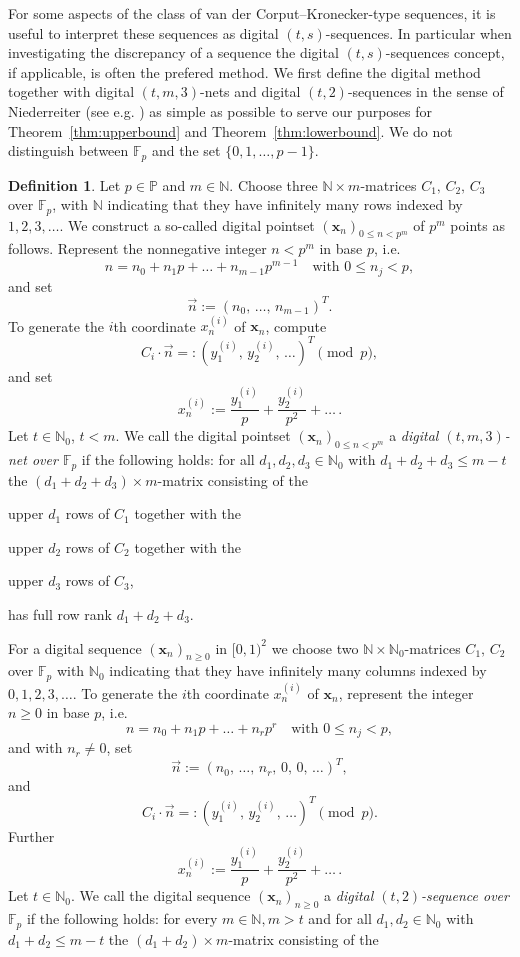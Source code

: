 \documentclass{article}
\newcommand{\bsx}{\boldsymbol{x}}%
\newcommand{\bsT}{\boldsymbol{T}}%
\newcommand{\NN}{\mathbb N}
\newcommand{\PP}{\mathbb P}
\newcommand{\FF}{\mathbb{F}}
\renewcommand{\(}{\left (}
\renewcommand{\)}{\right )}
\theoremstyle{definition}
\newtheorem{definition}[theorem]{Definition}
\numberwithin{equation}{section}
\begin{document}
For some aspects of the class of van der Corput--Kronecker-type sequences, it is useful to interpret these sequences as digital $(t,s)$-sequences. In particular when investigating the discrepancy of a sequence the digital $(t,s)$-sequences concept, if applicable, is often the prefered method. We first define the digital method together with digital $(t,m,3)$-nets and digital $(t,2)$-sequences in the sense of Niederreiter (see e.g. \cite{niesiam}) as simple as possible to serve our purposes for Theorem~\ref{thm:upperbound} and Theorem~\ref{thm:lowerbound}. We do not distinguish between $\FF_p$ and the set $\{0,1,\ldots,p-1\}$. 



\begin{definition}\label{def:t}
Let $p\in\PP$ and $m\in\NN$. Choose three $\NN\times m$-matrices $C_1,\,C_2,\,C_3$ over $\FF_p$, with $\NN$ indicating that they have infinitely many rows indexed by $1,2,3,\ldots$.  We construct a so-called digital pointset $(\bsx_n)_{0\leq n<p^m}$ of $p^m$ points as follows. Represent the nonnegative integer $n<p^m$ in base $p$, i.e.
$$ n = n_0+n_1p+\dots+n_{m-1}p^{m-1}\quad \mbox{with }0\leq n_j<p, $$
and set
$$ \vec n :=(n_0,\,\dots,\,n_{m-1})^T. $$
To generate the $i$th coordinate $x_n^{(i)}$ of $\bsx_n$, compute 
$$ C_i\cdot\vec n =:(y_1^{(i)},\,y_2^{(i)},\,\dots)^T\pmod{p}, $$
and set
$$ x_n^{(i)}:=\frac {y_1^{(i)}}p+\frac {y_2^{(i)}}{p^2}+\dots\,. $$
Let $t\in\NN_0$, $t<m$. We call the digital pointset $(\bsx_n)_{0\leq n<p^m}$ a \emph{digital $(t,m,3)$-net over $\FF_p$} if the following holds: 
for all $d_1,d_2,d_3\in\NN_0$ with $d_1+d_2+d_3\leq m-t$ the $(d_1+d_2+d_3)\times m$-matrix consisting of the

upper $d_1$ rows of $C_1$ together with the

upper $d_2$ rows of $C_2$ together with the

upper $d_3$ rows of $C_3$, 

\noindent has full row rank $d_1+d_2+d_3$.


For a digital sequence $(\bsx_n)_{n\geq 0}$ in $ [0,1)^2$ we choose two $\NN\times\NN_0$-matrices $C_1,\,C_2$ over $\FF_p$  with $\NN_0$ indicating that they have infinitely many columns indexed by $0,1,2,3,\ldots$. To generate the $i$th coordinate $x_n^{(i)}$ of $\bsx_n$, represent the integer $n\geq 0$ in base $p$, i.e.
$$ n = n_0+n_1p+\dots+n_rp^r\quad \mbox{with }0\leq n_j<p, $$
and with $n_r\neq 0$, set
$$ \vec n :=(n_0,\,\dots,\,n_r,\,0,\,0,\,\dots)^T, $$
and 
$$ C_i\cdot\vec n =:(y_1^{(i)},\,y_2^{(i)},\,\dots)^T\pmod{p}. $$
Further
$$ x_n^{(i)}:=\frac {y_1^{(i)}}p+\frac {y_2^{(i)}}{p^2}+\dots\,. $$
Let $t\in\NN_0$. We call the digital sequence $(\bsx_n)_{n\ge 0}$ a \emph{digital $(t,2)$-sequence over $\FF_p$} if the following holds: 
for every $m\in\NN, m>t$ and for all $d_1,d_2\in\NN_0$ with $d_1+d_2\leq m-t$ the $(d_1+d_2)\times m$-matrix consisting of the


\end{definition}
\end{document}
